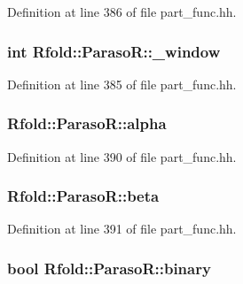 Definition at line 386 of file part\+\_\+func.\+hh.

\hypertarget{class_rfold_1_1_paraso_r_a6b2fc60e2c500a03bf48d442cb11002c}{
\subsubsection[{\+\_\+window}]{\setlength{\rightskip}{0pt plus 5cm}int Rfold\+::\+Paraso\+R\+::\+\_\+window}}\label{class_rfold_1_1_paraso_r_a6b2fc60e2c500a03bf48d442cb11002c}


Definition at line 385 of file part\+\_\+func.\+hh.

\hypertarget{class_rfold_1_1_paraso_r_a9f5a209eb1cd9de0f4f01c23f4f5e111}{
\subsubsection[{alpha}]{ Rfold\+::\+Paraso\+R\+::alpha}}\label{class_rfold_1_1_paraso_r_a9f5a209eb1cd9de0f4f01c23f4f5e111}


Definition at line 390 of file part\+\_\+func.\+hh.

\hypertarget{class_rfold_1_1_paraso_r_a4ebc3071b4f1aa34c75af71d88cf7382}{
\subsubsection[{beta}]{ Rfold\+::\+Paraso\+R\+::beta}}\label{class_rfold_1_1_paraso_r_a4ebc3071b4f1aa34c75af71d88cf7382}


Definition at line 391 of file part\+\_\+func.\+hh.

\hypertarget{class_rfold_1_1_paraso_r_af2bb3eef2ea5d6f92d490f2a36c8ab64}{
\subsubsection[{binary}]{\setlength{\rightskip}{0pt plus 5cm}bool Rfold\+::\+Paraso\+R\+::binary}}\label{class_rfold_1_1_paraso_r_af2bb3eef2ea5d6f92d490f2a36c8ab64}


